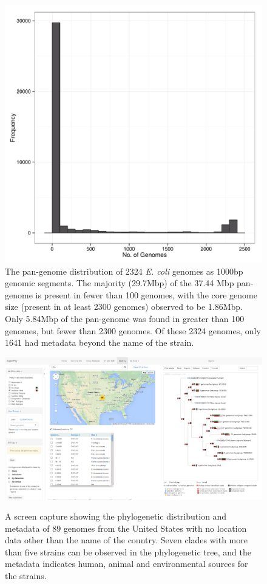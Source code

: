 \documentclass[doublespacing, linenumbers]{bmcart}
\begin{document}
\begin{backmatter}
\newpage
\begin{figure}[h!]
  \includegraphics[width=0.9\columnwidth]{images/panGenomeSize.pdf}
  \caption{The pan-genome distribution of 2324 \textit{E. coli} genomes as 1000bp genomic segments. The majority (29.7Mbp) of the 37.44 Mbp pan-genome is present in fewer than 100 genomes, with the core genome size (present in at least 2300 genomes) observed to be 1.86Mbp. Only 5.84Mbp of the pan-genome was found in greater than 100 genomes, but fewer than 2300 genomes. Of these 2324 genomes, only 1641 had metadata beyond the name of the strain. }
  \label{fig:pan_genome_size}
\end{figure}

\newpage
\begin{figure}[h!]
  \caption{A screen capture showing the phylogenetic distribution and metadata of 89 genomes from the United States with no location data other than the name of the country.  Seven clades with more than five strains can be observed in the phylogenetic tree, and the metadata indicates human, animal and environmental sources for the strains.}
  \includegraphics[width=0.9\columnwidth]{images/usa_o157.png}
  \label{fig:usa_o157}
\end{figure}


\end{backmatter}
\end{document}
